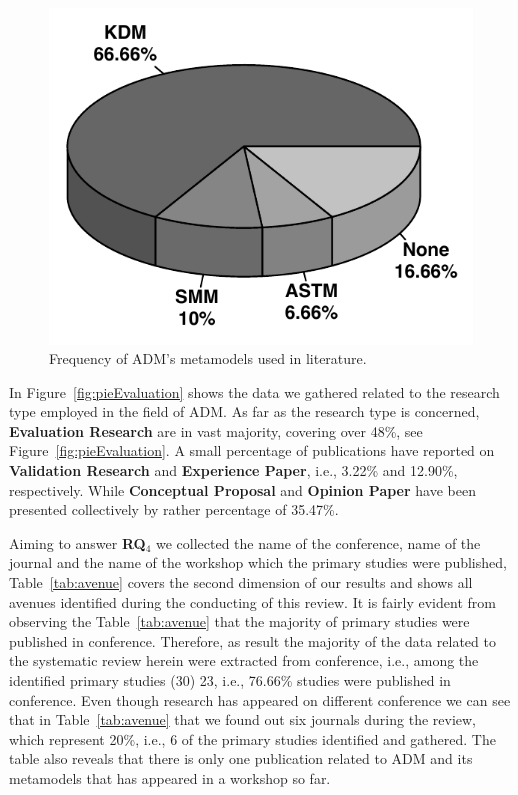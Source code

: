  \begin{figure}[!h]
 \centering
   \includegraphics[scale=0.5]{figuras/pieChartModel}
 \caption{Frequency of ADM's metamodels used in literature.}
 \label{fig:pie}
\end{figure} 


In Figure~\ref{fig:pieEvaluation} shows the data we gathered related to the research type employed in the field of ADM. As far as the research type is concerned, \textbf{Evaluation Research} are in vast majority, covering over 48\%, see Figure~\ref{fig:pieEvaluation}. A small percentage of publications have reported on \textbf{Validation Research} and \textbf{Experience Paper}, i.e., 3.22\% and 12.90\%, respectively. While \textbf{Conceptual Proposal}
 and \textbf{Opinion Paper} have been presented collectively by rather percentage of 35.47\%.

 Aiming to answer \textbf{RQ$_4$} we collected the name of the conference, name of the journal and the name of the workshop which the primary studies were published, Table~\ref{tab:avenue} covers the second dimension of our results and shows all avenues identified during the conducting of this review. It is fairly evident from observing the Table~\ref{tab:avenue} that the majority of primary studies were published in conference. Therefore, as result the majority of the data related to the systematic review herein were extracted from conference, i.e., among the identified primary studies (30) 23, i.e., 76.66\% studies were published in conference. Even though research has appeared on different conference we can see that in Table~\ref{tab:avenue} that we found out six journals during the review, which represent 20\%, i.e., 6 of the primary studies identified and gathered. The table also reveals that there is only one publication related to ADM and its metamodels that has appeared in a workshop so far.



